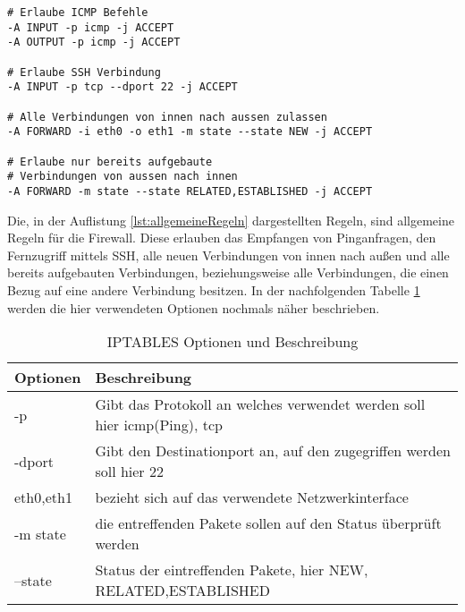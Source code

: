 \newline
\lstset{
	basicstyle=\footnotesize, frame=tb,
	xleftmargin=.2\textwidth, xrightmargin=.2\textwidth
}
\begin{lstlisting}[caption={Weitere allgemeine Firewallregeln},label=lst:allgemeineRegeln]
# Erlaube ICMP Befehle
-A INPUT -p icmp -j ACCEPT
-A OUTPUT -p icmp -j ACCEPT

# Erlaube SSH Verbindung
-A INPUT -p tcp --dport 22 -j ACCEPT

# Alle Verbindungen von innen nach aussen zulassen
-A FORWARD -i eth0 -o eth1 -m state --state NEW -j ACCEPT

# Erlaube nur bereits aufgebaute 
# Verbindungen von aussen nach innen
-A FORWARD -m state --state RELATED,ESTABLISHED -j ACCEPT
\end{lstlisting}
\vspace{\baselineskip}
Die, in der Auflistung \ref{lst:allgemeineRegeln} dargestellten Regeln, sind allgemeine Regeln für die Firewall. Diese erlauben das Empfangen von Pinganfragen, den Fernzugriff mittels SSH, alle neuen Verbindungen von innen nach außen und alle bereits aufgebauten Verbindungen, beziehungsweise alle Verbindungen, die einen Bezug auf eine andere Verbindung besitzen. In der nachfolgenden Tabelle \ref*{tab:iptablesOptionen} werden die hier verwendeten Optionen nochmals näher beschrieben.
\begin{table}[h]
	\centering
\begin{tabular}{|p{2cm}|p{13cm}|}
	\hline 
	Optionen & Beschreibung \\ 
	\hline 
	-p & Gibt das Protokoll an welches verwendet werden soll hier icmp(Ping), tcp \\ 
	\hline 
	-dport & Gibt den Destinationport an, auf den zugegriffen werden soll hier 22 \\ 
	\hline
	eth0,eth1 & bezieht sich auf das verwendete Netzwerkinterface \\ 
	\hline 
	-m state & die entreffenden Pakete sollen auf den Status überprüft werden \\ 
	\hline 
	--state & Status der eintreffenden Pakete, hier NEW, RELATED,ESTABLISHED \\ 
	\hline 
\end{tabular} 
\caption{IPTABLES Optionen und Beschreibung} \label{tab:iptablesOptionen}
\end{table}
